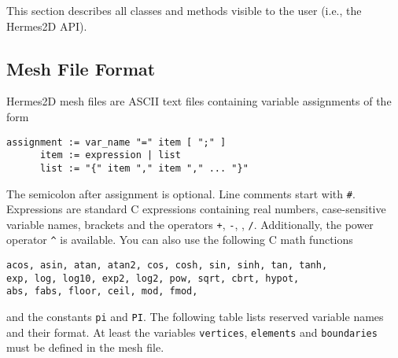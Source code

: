 

This section describes all classes and methods visible to the user (i.e., the Hermes2D API).





\subsection{Mesh File Format}
\label{meshformat}

Hermes2D mesh files are ASCII text files containing variable assignments of the form
\begin{lstlisting}
assignment := var_name "=" item [ ";" ]
      item := expression | list
      list := "{" item "," item "," ... "}"
\end{lstlisting}
The semicolon after assignment is optional. Line comments start with \verb"#". Expressions
are standard C expressions containing real numbers, case-sensitive variable names,
brackets and the operators {\tt +}, {\tt -}, {\tt *}, {\tt /}.
Additionally, the power operator \verb"^" is available.
You can also use the following C math functions
\begin{lstlisting}
acos, asin, atan, atan2, cos, cosh, sin, sinh, tan, tanh,
exp, log, log10, exp2, log2, pow, sqrt, cbrt, hypot,
abs, fabs, floor, ceil, mod, fmod,
\end{lstlisting}
and the constants {\tt pi} and {\tt PI}.
The following table lists reserved variable names and their format. At least
the variables {\tt vertices}, {\tt elements} and {\tt boundaries} must be defined
in the mesh file.
